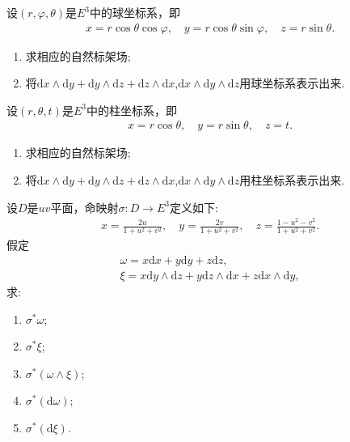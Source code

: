 \documentclass[../../main.tex]{subfiles}%
\begin{document}
\begin{example}
设$(r,\varphi,\theta)$是$E^3$中的球坐标系，即
\begin{align*}
x = r\cos\theta\cos\varphi,\quad y = r\cos\theta\sin\varphi,\quad z = r\sin\theta.
\end{align*}
\begin{enumerate}[(1)]
\item 求相应的自然标架场;
\item 将$\mathrm{d}x \wedge \mathrm{d}y + \mathrm{d}y \wedge \mathrm{d}z + \mathrm{d}z \wedge \mathrm{d}x$,$\mathrm{d}x \wedge \mathrm{d}y \wedge \mathrm{d}z$用球坐标系表示出来.
\end{enumerate}
\end{example}

\begin{example}
设$(r,\theta,t)$是$E^3$中的柱坐标系，即
\begin{align*}
x = r\cos\theta,\quad y = r\sin\theta,\quad z = t.
\end{align*}
\begin{enumerate}[(1)]
\item 求相应的自然标架场;
\item 将$\mathrm{d}x \wedge \mathrm{d}y + \mathrm{d}y \wedge \mathrm{d}z + \mathrm{d}z \wedge \mathrm{d}x$,$\mathrm{d}x \wedge \mathrm{d}y \wedge \mathrm{d}z$用柱坐标系表示出来.
\end{enumerate}
\end{example}

\begin{example}
设$D$是$uv$平面，命映射$\sigma:D \to E^3$定义如下:
\begin{align*}
x = \frac{2u}{1+u^2+v^2},\quad y = \frac{2v}{1+u^2+v^2},\quad z = \frac{1-u^2-v^2}{1+u^2+v^2}.
\end{align*}
假定
\begin{align*}
\omega = x\mathrm{d}x + y\mathrm{d}y + z\mathrm{d}z, \\
\xi = x\mathrm{d}y \wedge \mathrm{d}z + y\mathrm{d}z \wedge \mathrm{d}x + z\mathrm{d}x \wedge \mathrm{d}y,
\end{align*}
求:
\begin{enumerate}[(1)]
\item $\sigma^*\omega$;
\item $\sigma^*\xi$;
\item $\sigma^*(\omega \wedge \xi)$;
\item $\sigma^*(\mathrm{d}\omega)$;
\item $\sigma^*(\mathrm{d}\xi)$.
\end{enumerate}
\end{example}
\end{document}
